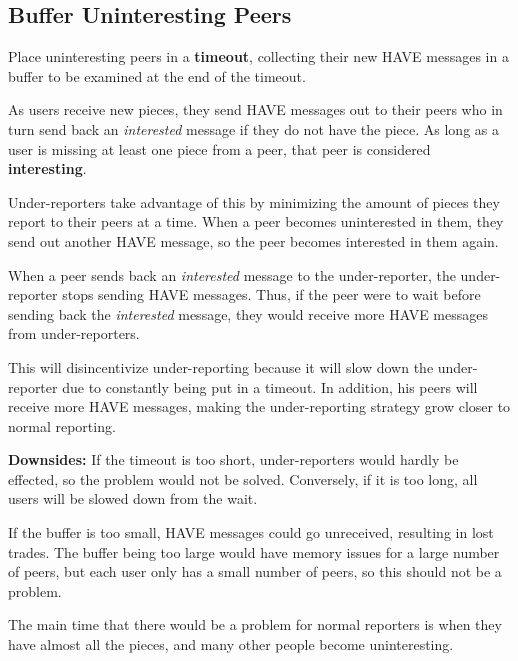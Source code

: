 \subsection{Buffer Uninteresting Peers}

Place uninteresting peers in a \textbf{timeout}, collecting their new HAVE messages in a buffer to be examined at the end of the timeout.

As users receive new pieces, they send HAVE messages out to their peers who in turn send back an \textit{interested} message if they do not have the piece. As long as a user is missing at least one piece from a peer, that peer is considered \textbf{interesting}.

Under-reporters take advantage of this by minimizing the amount of pieces they report to their peers at a time. When a peer becomes uninterested in them, they send out another HAVE message, so the peer becomes interested in them again.

When a peer sends back an \textit{interested} message to the under-reporter, the under-reporter stops sending HAVE messages. Thus, if the peer were to wait before sending back the \textit{interested} message, they would receive more HAVE messages from under-reporters.

This will disincentivize under-reporting because it will slow down the under-reporter due to constantly being put in a timeout. In addition, his peers will receive more HAVE messages, making the under-reporting strategy grow closer to normal reporting.

\textbf{Downsides:} If the timeout is too short, under-reporters would hardly be effected, so the problem would not be solved. Conversely, if it is too long, all users will be slowed down from the wait.

If the buffer is too small, HAVE messages could go unreceived, resulting in lost trades. The buffer being too large would have memory issues for a large number of peers, but each user only has a small number of peers, so this should not be a problem.

The main time that there would be a problem for normal reporters is when they have almost all the pieces, and many other people become uninteresting.
